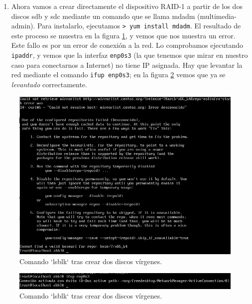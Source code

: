 \documentclass[
]{memoir}
\providecommand{\tightlist}{%
  \setlength{\itemsep}{0pt}\setlength{\parskip}{0pt}}
\begin{document}
\begin{enumerate}
\def\labelenumi{\arabic{enumi}.}
\setcounter{enumi}{2}
\tightlist
\item
  Ahora vamos a crear directamente el dispositivo RAID-1 a partir de los dos discos sdb y sdc mediante un comando que se llama mdadm (multimedia-admin). Para instalarlo, ejecutamos \texttt{\textgreater{}\ yum\ install\ mdadm}. El resultado de este proceso se muestra en la figura \ref{fig:3h}, y vemos que nos muestra un error. Este fallo es por un error de conexión a la red. Lo comprobamos ejecutando \texttt{ipaddr}, y vemos que la interfaz \texttt{enp0s3} (la que tenemos que mirar en nuestro caso para conectarnos a Internet) no tiene IP asignada. Hay que levantar la red mediante el comando \texttt{ifup\ enp0s3}; en la figura \ref{fig:4h} vemos que ya se \emph{levantado} correctamente.
\end{enumerate}

\begin{figure}

{\centering \includegraphics[width=0.9\linewidth]{images/3} 

}

\caption{Comando `lsblk` tras crear dos discos vírgenes.}\label{fig:3h}
\end{figure}

\begin{figure}

{\centering \includegraphics[width=0.95\linewidth]{images/4} 

}

\caption{Comando `lsblk` tras crear dos discos vírgenes.}\label{fig:4h}
\end{figure}
\end{document}
